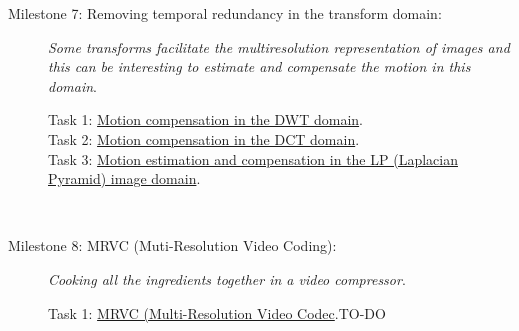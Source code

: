\begin{description}
\item [Milestone 7: {\normalfont Removing temporal redundancy in the
    transform domain:}] \emph{Some transforms facilitate the
multiresolution representation of images and this can be interesting to
estimate and compensate the motion in this domain}.
  \begin{description}
  \item [Task 1: {\normalfont
      \href{https://sistemas-multimedia.github.io/contents/ME_MC_in_DWT_domain/}{Motion
        compensation in the DWT domain}.}]
  \item [Task 2: {\normalfont
      \href{https://sistemas-multimedia.github.io/contents/ME_MC_in_DCT_domain/}{Motion
        compensation in the DCT domain}.}]
  \item [Task 3: {\normalfont
      \href{https://sistemas-multimedia.github.io/contents/ME_MC_in_LP_domain/}{Motion
        estimation and compensation in the LP (Laplacian Pyramid) image domain}.}]
  \end{description}
  ~\newline

\item [Milestone 8: {\normalfont MRVC (Muti-Resolution Video
    Coding):}] \emph{Cooking all the ingredients together in a video compressor}.
  \begin{description}
  \item [Task 1: {\normalfont
      \href{https://github.com/Sistemas-Multimedia/MRVC}{MRVC
        (Multi-Resolution Video Codec}.TO-DO}]
  \end{description}

  
  \begin{comment}

 \item [Milestone 2: {\normalfont Removing the color redundancy:}]
   \emph{In color images, the RGB channels tend to be highly
   correlated. We can take advantage of this channel correlation, for
   example, to decrease the entropy and therefore, increase the
   compression ratio in image and video coding}.
  \begin{description}
  \item [Task 4: {\normalfont
      \href{https://sistemas-multimedia.github.io/contents/color_DCT/}{The
        1D-DCT (1-Dimensional Discrete Cosine Transform) transform}
      applied over the color domain.}]
  \item [Task 5: {\normalfont
      \href{https://sistemas-multimedia.github.io/contents/YCrCb/}{The
        YCrCb transform}.}]
  \item [Task 6: {\normalfont
      \href{https://sistemas-multimedia.github.io/contents/YCoCg/}{The
        YCoCg transform}.}]
  \end{description}
  ~\newline


\end{comment}
\end{description}
